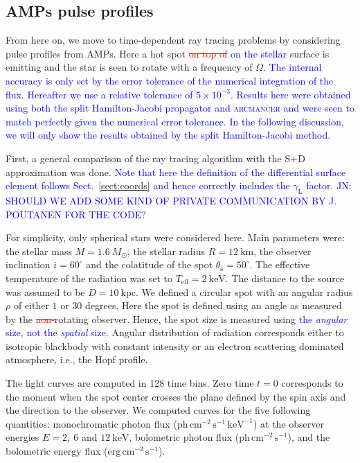 \documentclass{aa}
\newcommand{\refe}[1]{\textcolor{blue}{{#1}}}
\newcommand{\refedel}[1]{\textcolor{red}{\sout{#1}}}
\newcommand{\Msun}{\ensuremath{M_{\odot}}}
\newcommand{\lgamma}{\gamma_{\text{L}}}
\begin{document}
\subsection{AMPs pulse profiles}\label{sect:AMPs}

From here on, we move to time-dependent ray tracing problems by considering pulse profiles from AMPs.
Here a hot spot \refedel{on top of} \refe{on the stellar} surface is emitting and the star is seen to rotate with a frequency of $\Omega$.
\refe{The internal accuracy is only set by the error tolerance of the numerical integration of the flux.
Hereafter we use a relative tolerance of $5 \times 10^{-3}$.
Results here were obtained using both the split Hamilton-Jacobi propagator and \textsc{arcmancer} and were seen to match perfectly given the numerical error tolerance.
In the following discussion, we will only show the results obtained by the split Hamilton-Jacobi method.
}


First, a general comparison of the ray tracing algorithm with the S+D approximation was done. 
\refe{Note that here the definition of the differential surface element follows Sect.~\ref{sect:coords} and hence correctly includes the $\lgamma$ factor.}
\refe{JN: SHOULD WE ADD SOME KIND OF PRIVATE COMMUNICATION BY J. POUTANEN FOR THE CODE?}

For simplicity, only spherical stars were considered here.
Main parameters were: the stellar mass $M = 1.6~\Msun$, the stellar radius $R = 12~\mathrm{km}$, the observer inclination $i = 60^{\circ}$ and the colatitude of the spot $\theta_{\mathrm{s}} = 50^{\circ}$.  
The effective temperature of the radiation was set to $T_{\mathrm{eff}} = 2~\mathrm{keV}$.  
The distance to the source was assumed to be $D = 10~\mathrm{kpc}$.  
We defined a circular spot with an angular radius $\rho$ of either $1$ or $30$ degrees.
Here the spot is defined using an angle as measured by the \refedel{non-}rotating observer.
Hence, the spot size is measured using \refe{the \textit{angular} size, not the \textit{spatial} size.}
Angular distribution of radiation corresponds either to isotropic blackbody with constant intensity or an electron scattering dominated atmosphere, i.e., the Hopf profile.


The light curves are computed in 128 time bins.  Zero time $t = 0$ corresponds to the moment when the spot center crosses the plane defined by the spin axis and the direction to the observer.  
We computed curves for the five following quantities: monochromatic photon flux ($\mathrm{ph}\,\mathrm{cm}^{-2}\,\mathrm{s}^{-1}\,\mathrm{keV}^{-1}$) at the observer energies $E = 2,~6$ and $12~\mathrm{keV}$, bolometric photon flux ($\mathrm{ph}\,\mathrm{cm}^{-2}\,\mathrm{s}^{-1}$), and the bolometric energy flux ($\mathrm{erg}\,\mathrm{cm}^{-2}\,\mathrm{s}^{-1}$).
\end{document}
